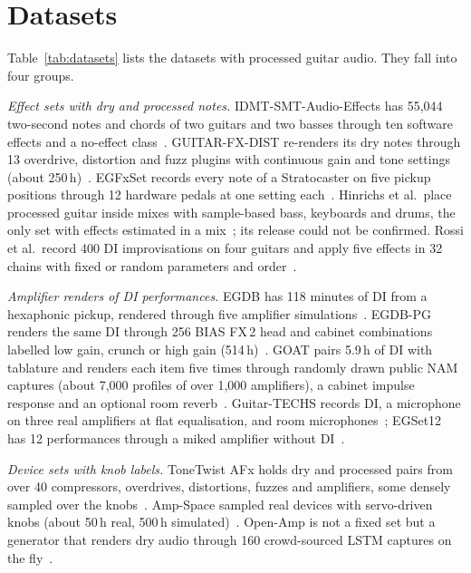 \section{Datasets}
\label{sec:datasets}

Table~\ref{tab:datasets} lists the datasets with processed guitar audio. They
fall into four groups.

\emph{Effect sets with dry and processed notes.} IDMT-SMT-Audio-Effects has
55,044 two-second notes and chords of two guitars and two basses through ten
software effects and a no-effect class~\cite{stein2010aes}. GUITAR-FX-DIST
re-renders its dry notes through 13 overdrive, distortion and fuzz plugins with
continuous gain and tone settings (about 250\,h)~\cite{comunita2021guitar}.
EGFxSet records every note of a Stratocaster on five pickup positions through
12 hardware pedals at one setting each~\cite{pedroza2022egfxset}. Hinrichs et
al.\ place processed guitar inside mixes with sample-based bass, keyboards and
drums, the only set with effects estimated in a mix~\cite{hinrichs2022convolutional};
its release could not be confirmed. Rossi et al.\ record 400 DI improvisations
on four guitars and apply five effects in 32 chains with fixed or random
parameters and order~\cite{rossi2025automatic}.

\emph{Amplifier renders of DI performances.} EGDB has 118 minutes of DI from
a hexaphonic pickup, rendered through five amplifier simulations~\cite{chen2022egdb}.
EGDB-PG renders the same DI through 256 BIAS FX\,2 head and cabinet
combinations labelled low gain, crunch or high gain (514\,h)~\cite{chen2026toward}.
GOAT pairs 5.9\,h of DI with tablature and renders each item five times
through randomly drawn public NAM captures (about 7,000 profiles of over
1,000 amplifiers), a cabinet impulse response and an optional room
reverb~\cite{loth2025goat}. Guitar-TECHS records DI, a microphone on three
real amplifiers at flat equalisation, and room microphones~\cite{pedroza2025guitartechs};
EGSet12 has 12 performances through a miked amplifier without
DI~\cite{pedroza2024egset12}.

\emph{Device sets with knob labels.} ToneTwist AFx holds dry and processed
pairs from over 40 compressors, overdrives, distortions, fuzzes and
amplifiers, some densely sampled over the knobs~\cite{comunita2025differentiable}.
Amp-Space sampled real devices with servo-driven knobs (about 50\,h real,
500\,h simulated)~\cite{naradowsky2021ampspace}. Open-Amp is not a fixed set
but a generator that renders dry audio through 160 crowd-sourced LSTM
captures on the fly~\cite{wright2025openamp}.

